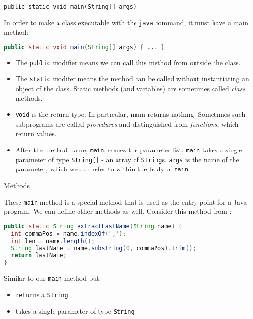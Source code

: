 \documentclass{beamer}
\begin{document}
\begin{frame}[fragile]{{\tt public static void main(String[] args)}}


In order to make a class executable with the {\tt java} command, it must have a main method:
\begin{lstlisting}[language=Java]
public static void main(String[] args) { ... }
\end{lstlisting}
\vspace{-.1in}
\begin{itemize}
\item The {\tt public} modifier means we can call this method from outside the class.
\item The {\tt static} modifer means the method can be called without instantiating an object of the class.  Static methods (and variables) are sometimes called {\it class} methods.
\item {\tt void} is the return type.  In particular, main returns nothing.  Sometimes such subprograms are called {\it procedures} and distinguished from {\it functions}, which return values.
\item After the method name, {\tt main}, comes the parameter list.  {\tt main} takes a single parameter of type {\tt String[]} - an array of {\tt String}s.  {\tt args} is the name of the parameter, which we can refer to within the body of {\tt main}
\end{itemize}

\end{frame}

\begin{frame}[fragile]{Methods}

These {\tt main} method is a special method that is used as the entry point for a Java program.  We can define other methods as well.  Consider this method from :

\begin{lstlisting}[language=Java]
public static String extractLastName(String name) {
  int commaPos = name.indexOf(",");
  int len = name.length();
  String lastName = name.substring(0, commaPos).trim();
  return lastName;
}
\end{lstlisting}
Similar to our {\tt main} method but:
\begin{itemize}
\item {\tt return}s a {\tt String}
\item takes a single parameter of type {\tt String}
\end{itemize}

\end{frame}
\end{document}
